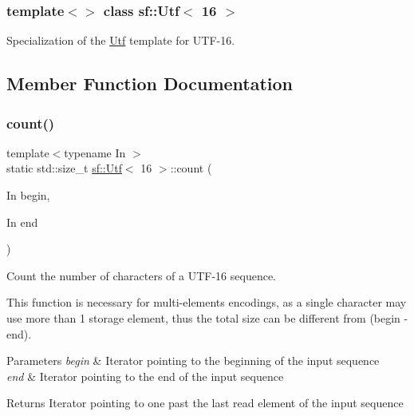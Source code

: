 \subsubsection*{template$<$$>$\newline
class sf\+::\+Utf$<$ 16 $>$}

Specialization of the \hyperlink{classsf_1_1_utf}{Utf} template for U\+T\+F-\/16. 

\subsection{Member Function Documentation}
\mbox{\label{classsf_1_1_utf_3_0116_01_4_a6df8d9be8211ffe1095b3b82eac83f6f}} 
\subsubsection{\texorpdfstring{count()}{count()}}
{\footnotesize\ttfamily template$<$typename In $>$ \\
static std\+::size\+\_\+t \hyperlink{classsf_1_1_utf}{sf\+::\+Utf}$<$ 16 $>$\+::count (\begin{DoxyParamCaption}\item[{In}]{begin,  }\item[{In}]{end }\end{DoxyParamCaption})\hspace{0.3cm}{\ttfamily [static]}}



Count the number of characters of a U\+T\+F-\/16 sequence. 

This function is necessary for multi-\/elements encodings, as a single character may use more than 1 storage element, thus the total size can be different from (begin -\/ end).


\begin{DoxyParams}{Parameters}
{\em begin} & Iterator pointing to the beginning of the input sequence \\
\hline
{\em end} & Iterator pointing to the end of the input sequence\\
\hline
\end{DoxyParams}
\begin{DoxyReturn}{Returns}
Iterator pointing to one past the last read element of the input sequence 
\end{DoxyReturn}
\mbox{\label{classsf_1_1_utf_3_0116_01_4_a17be6fc08e51182e7ac8bf9269dfae37}} 
